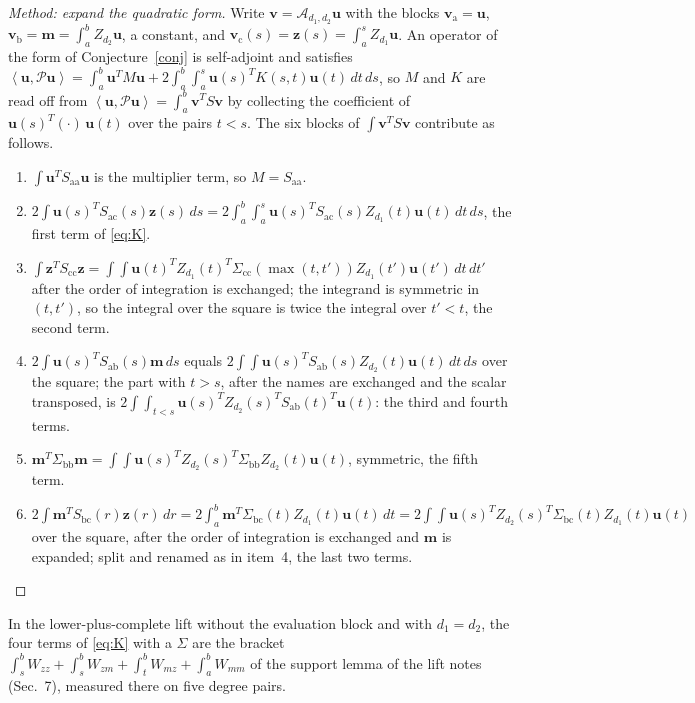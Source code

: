 \documentclass[12pt]{article}
\newcommand{\mcl}[1]{\mathcal{#1}}
\newcommand{\mbf}[1]{\mathbf{#1}}
\newcommand{\ip}[2]{\left\langle #1,#2\right\rangle}
\newcommand{\ba}{\mathrm{a}}
\newcommand{\bb}{\mathrm{b}}
\newcommand{\bc}{\mathrm{c}}
\theoremstyle{plain}
\theoremstyle{definition}
\theoremstyle{remark}
\begin{document}
\begin{proof}[Method: expand the quadratic form]
Write $\mbf v=\mcl A_{d_1,d_2}\mbf u$ with the blocks $\mbf v_\ba=\mbf u$, $\mbf v_\bb=\mbf m=\int_a^bZ_{d_2}\mbf u$, a constant, and $\mbf v_\bc(s)=\mbf z(s)=\int_a^sZ_{d_1}\mbf u$. An operator of the form of Conjecture~\ref{conj} is self-adjoint and satisfies $\ip{\mbf u}{\mcl P\mbf u}=\int_a^b\mbf u^TM\mbf u+2\int_a^b\!\!\int_a^s\mbf u(s)^TK(s,t)\mbf u(t)\,dt\,ds$, so $M$ and $K$ are read off from $\ip{\mbf u}{\mcl P\mbf u}=\int_a^b\mbf v^TS\mbf v$ by collecting the coefficient of $\mbf u(s)^T(\cdot)\,\mbf u(t)$ over the pairs $t<s$. The six blocks of $\int\mbf v^TS\mbf v$ contribute as follows.
\begin{enumerate}\setlength\itemsep{0pt}
\item $\int\mbf u^TS_{\ba\ba}\mbf u$ is the multiplier term, so $M=S_{\ba\ba}$.
\item $2\int\mbf u(s)^TS_{\ba\bc}(s)\mbf z(s)\,ds=2\int_a^b\!\!\int_a^s\mbf u(s)^TS_{\ba\bc}(s)Z_{d_1}(t)\mbf u(t)\,dt\,ds$, the first term of \eqref{eq:K}.
\item $\int\mbf z^TS_{\bc\bc}\mbf z=\int\!\!\int\mbf u(t)^TZ_{d_1}(t)^T\Sigma_{\bc\bc}(\max(t,t'))Z_{d_1}(t')\mbf u(t')\,dt\,dt'$ after the order of integration is exchanged; the integrand is symmetric in $(t,t')$, so the integral over the square is twice the integral over $t'<t$, the second term.
\item $2\int\mbf u(s)^TS_{\ba\bb}(s)\mbf m\,ds$ equals $2\int\!\!\int\mbf u(s)^TS_{\ba\bb}(s)Z_{d_2}(t)\mbf u(t)\,dt\,ds$ over the square; the part with $t>s$, after the names are exchanged and the scalar transposed, is $2\int\!\!\int_{t<s}\mbf u(s)^TZ_{d_2}(s)^TS_{\ba\bb}(t)^T\mbf u(t)$: the third and fourth terms.
\item $\mbf m^T\Sigma_{\bb\bb}\mbf m=\int\!\!\int\mbf u(s)^TZ_{d_2}(s)^T\Sigma_{\bb\bb}Z_{d_2}(t)\mbf u(t)$, symmetric, the fifth term.
\item $2\int\mbf m^TS_{\bb\bc}(r)\mbf z(r)\,dr=2\int_a^b\mbf m^T\Sigma_{\bb\bc}(t)Z_{d_1}(t)\mbf u(t)\,dt=2\int\!\!\int\mbf u(s)^TZ_{d_2}(s)^T\Sigma_{\bb\bc}(t)Z_{d_1}(t)\mbf u(t)$ over the square, after the order of integration is exchanged and $\mbf m$ is expanded; split and renamed as in item~4, the last two terms. \qedhere
\end{enumerate}
\end{proof}

In the lower-plus-complete lift without the evaluation block and with $d_1=d_2$, the four terms of \eqref{eq:K} with a $\Sigma$ are the bracket $\int_s^bW_{zz}+\int_s^bW_{zm}+\int_t^bW_{mz}+\int_a^bW_{mm}$ of the support lemma of the lift notes (Sec.~7), measured there on five degree pairs.
\end{document}
